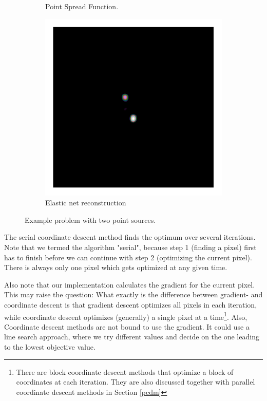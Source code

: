 \begin{figure}[h]
\begin{subfigure}[b]{0.3\linewidth}
		\caption{Point Spread Function.}
		\label{cd:serial:aid:psf}
	\end{subfigure}
	\begin{subfigure}[b]{0.3\linewidth}
		\includegraphics[width=\linewidth, clip, trim= 0.25in 0.25in 0.25in 0.25in]{./chapters/03.cd/simulated/elasticNet.png}
		\caption{Elastic net reconstruction}
		\label{cd:serial:aid:elastic}
	\end{subfigure}

	\caption{Example problem with two point sources.}
	\label{cd:serial:aid:figure}
\end{figure}

The serial coordinate descent method finds the optimum over several iterations. Note that we termed the algorithm "serial", because step 1 (finding a pixel) first has to finish before we can continue with step 2 (optimizing the current pixel). There is always only one pixel which gets optimized at any given time.

Also note that our implementation calculates the gradient for the current pixel. This may raise the question: What exactly is the difference between gradient- and coordinate descent is that gradient descent optimizes all pixels in each iteration, while coordinate descent optimizes (generally) a single pixel at a time\footnote{There are block coordinate descent methods that optimize a block of coordinates at each iteration. They are also discussed together with parallel coordinate descent methods in Section \ref{pcdm}}. Also, Coordinate descent methods are not bound to use the gradient. It could use a line search approach, where we try different values and decide on the one leading to the lowest objective value.


